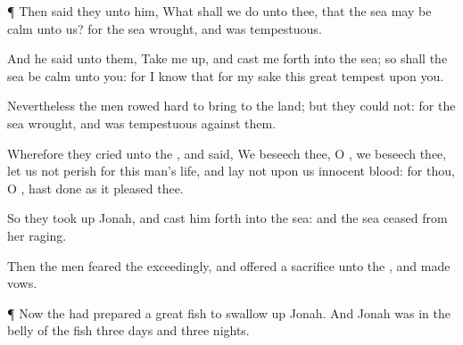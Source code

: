 {\par }{\PP {}¶ Then
said they unto him, What shall we
do unto thee, that the
sea may be
calm unto us? for the
sea
wrought, and was
tempestuous.

And he
said unto them, Take me
up, and cast me
forth into the
sea; so shall the
sea be
calm unto you: for I
know that for my
sake this
great
tempest
{} upon you.

Nevertheless the
men rowed
hard to
bring
{} to the
land; but they
could not: for the
sea
wrought, and was
tempestuous against them.

Wherefore they
cried unto the
{}, and
said, We beseech
thee, O
{}, we beseech thee, let us not
perish for this
man’s
life, and
lay not upon us
innocent
blood: for thou, O
{}, hast
done as it
pleased thee.

So they took
up
Jonah, and cast him
forth into the
sea: and the
sea
ceased from her
raging.

Then the
men
feared the
{}
exceedingly, and
offered a
sacrifice unto the
{}, and
made
vows.


\par }{\PP {}¶ Now the
{} had
prepared a
great
fish to swallow
up
Jonah. And
Jonah was in the
belly of the
fish
three
days and
three
nights.




\par }

